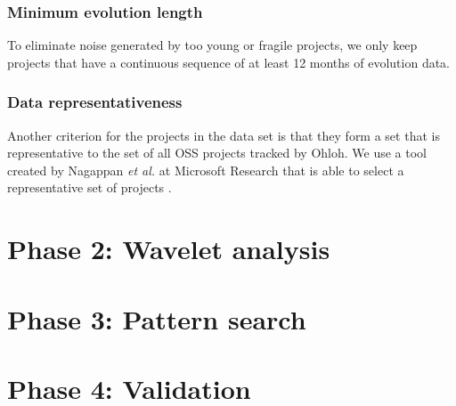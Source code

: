\subsubsection{Minimum evolution length}
To eliminate noise generated by too young or fragile projects, we only keep
projects that have a continuous sequence of at least 12 months of evolution
data.

\subsubsection{Data representativeness}
Another criterion for the projects in the data set is that they form a set that
is representative to the set of all OSS projects tracked by Ohloh. We use a tool
created by Nagappan \emph{et al. }\rm at Microsoft Research that is able to
select a representative set of projects \cite{nagappan}.



\section{Phase 2: Wavelet analysis}

\section{Phase 3: Pattern search}

\section{Phase 4: Validation}

